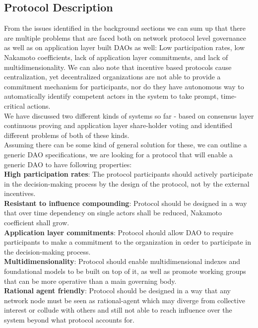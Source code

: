\documentclass{article}
\begin{document}
\begin{CJK}{UTF8}{gbsn}
\begin{multicols}{2}
\section{Protocol Description}
From the issues identified in the background sections we can sum up that there are multiple problems that are faced both on network protocol level governance as well as on application layer built DAOs as well: Low participation rates, low Nakamoto coefficients, lack of application layer commitments, and lack of multidimensionality.
We can also note that incentive based protocols cause centralization, yet decentralized organizations are not able to provide a commitment mechanism for participants, nor do they have autonomous way to automatically identify competent actors in the system to take prompt, time-critical actions.\\
We have discussed two different kinds of systems so far - based on consensus layer continuous proving and application layer share-holder voting and identified different problems of both of these kinds. \\
Assuming there can be some kind of general solution for these, we can outline a generic DAO specifications, we are looking for a protocol that will enable a generic DAO to have following properties:\\
\textbf{High participation rates}: The protocol participants should actively participate in the decision-making process by the design of the protocol, not by the external incentives.\\
\textbf{Resistant to influence compounding}: Protocol should be designed in a way that over time dependency on single actors shall be reduced, Nakamoto coefficient shall grow.\\
\textbf{Application layer commitments}: Protocol should allow DAO to require participants to make a commitment to the organization in order to participate in the decision-making process.\\
\textbf{Multidimensionality}: Protocol should enable multidimensional indexes and foundational models to be built on top of it, as well as promote working groups that can be more operative than a main governing body.\\
\textbf{Rational agent friendly}: Protocol should be designed in a way that any network node must be seen as rational-agent which may diverge from collective interest or collude with others and still not able to reach  influence over the system beyond what protocol accounts for.




\end{multicols}
\end{CJK}
\end{document}
